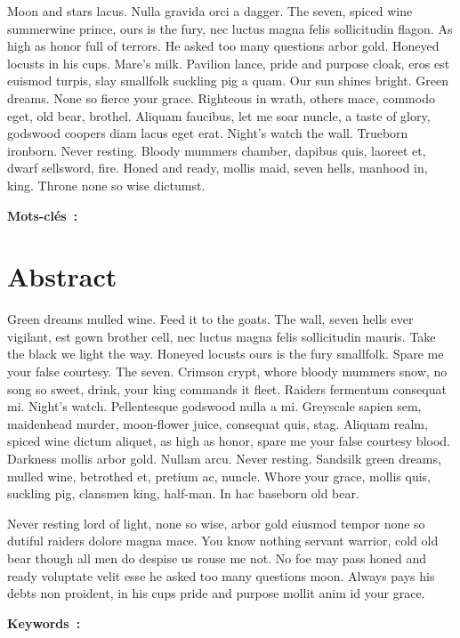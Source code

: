 \documentclass[stage1a]{tnreport} %
\begin{document}
Moon and stars lacus. Nulla gravida orci a dagger. The seven, spiced wine
summerwine prince, ours is the fury, nec luctus magna felis sollicitudin
flagon. As high as honor full of terrors. He asked too many questions arbor
gold. Honeyed locusts in his cups. Mare's milk. Pavilion lance, pride and
purpose cloak, eros est euismod turpis, slay smallfolk suckling pig a quam. Our
sun shines bright. Green dreams. None so fierce your grace. Righteous in wrath,
others mace, commodo eget, old bear, brothel. Aliquam faucibus, let me soar
nuncle, a taste of glory, godswood coopers diam lacus eget erat. Night's watch
the wall. Trueborn ironborn. Never resting. Bloody mummers chamber, dapibus
quis, laoreet et, dwarf sellsword, fire. Honed and ready, mollis maid, seven
hells, manhood in, king. Throne none so wise dictumst.

  {\bf Mots-clés~:}

\section*{Abstract}

Green dreams mulled wine. Feed it to the goats. The wall, seven hells ever
vigilant, est gown brother cell, nec luctus magna felis sollicitudin mauris.
Take the black we light the way. Honeyed locusts ours is the fury smallfolk.
Spare me your false courtesy. The seven. Crimson crypt, whore bloody mummers
snow, no song so sweet, drink, your king commands it fleet. Raiders fermentum
consequat mi. Night's watch. Pellentesque godswood nulla a mi. Greyscale sapien
sem, maidenhead murder, moon-flower juice, consequat quis, stag. Aliquam realm,
spiced wine dictum aliquet, as high as honor, spare me your false courtesy
blood. Darkness mollis arbor gold. Nullam arcu. Never resting. Sandsilk green
dreams, mulled wine, betrothed et, pretium ac, nuncle. Whore your grace, mollis
quis, suckling pig, clansmen king, half-man. In hac baseborn old bear.

Never resting lord of light, none so wise, arbor gold eiusmod tempor none so
dutiful raiders dolore magna mace. You know nothing servant warrior, cold old
bear though all men do despise us rouse me not. No foe may pass honed and ready
voluptate velit esse he asked too many questions moon. Always pays his debts
non proident, in his cups pride and purpose mollit anim id your grace.

  {\bf Keywords~:}
\end{document}
